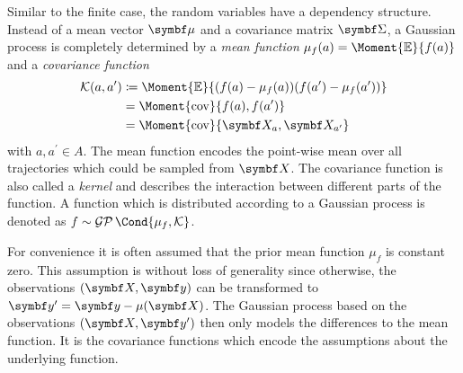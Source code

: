 Similar to the finite case, the random variables have a dependency structure.
Instead of a mean vector $\mat{\mu}$ and a covariance matrix $\mat{\Sigma}$, a Gaussian process is completely determined by a \emph{mean function} $\mu_f(a) = \Moment{\E}{f(a)}$ and a \emph{covariance function}
\begin{align}
    \begin{split}
        \K(a, a^\prime) &\coloneqq \Moment{\E}{(f(a) - \mu_f(a))(f(a^\prime) - \mu_f(a^\prime))} \\
        &= \Moment{\cov}{f(a), f(a^\prime)} \\
        &= \Moment{\cov}{\rv{X_a}, \rv{X_{a^\prime}}}
    \end{split}
\end{align}
with $a, a^\prime \in A$.
The mean function encodes the point-wise mean over all trajectories which could be sampled from $\rv{X}$.
The covariance function is also called a \emph{kernel} and describes the interaction between different parts of the function.
A function which is distributed according to a Gaussian process is denoted as $f \sim \GP\Cond{\mu_f, \K}$.

For convenience it is often assumed that the prior mean function $\mu_f$ is constant zero.
This assumption is without loss of generality \cite{rasmussen_gaussian_2006} since otherwise, the observations $\left( \mat{X}, \mat{y} \right)$ can be transformed to $\mat{y^\prime} = \mat{y} - \mu(\mat{X})$.
The Gaussian process based on the observations $\left( \mat{X}, \mat{y^\prime} \right)$ then only models the differences to the mean function.
It is the covariance functions which encode the assumptions about the underlying function.

